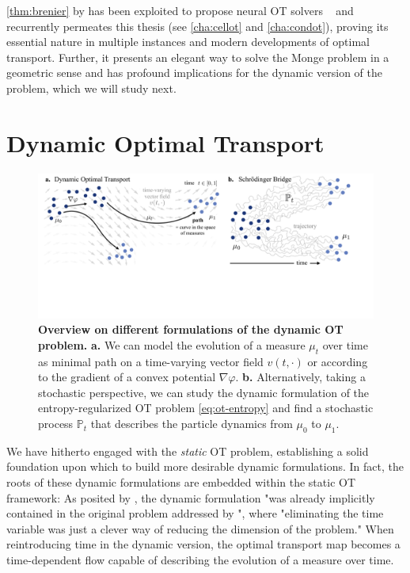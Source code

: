 \cref{thm:brenier} by \citet{brenier1987decomposition, brenier1991polar} has been exploited to propose neural OT solvers ~\citep{taghvaei20192, makkuva2020optimal, korotin2021wasserstein, bunne2022proximal, alvarez2021optimizing, mokrov2021large, amos2023amortizing} and recurrently permeates this thesis (see  \cref{cha:cellot} and \ref{cha:condot}), proving its essential nature in multiple instances and modern developments of optimal transport.
Further, it presents an elegant way to solve the Monge problem in a geometric sense and has profound implications for the dynamic version of the problem, which we will study next.


\section{Dynamic Optimal Transport} \label{sec:background_ot_dynamic}

\begin{figure}[t]
  \includegraphics[width=\textwidth]{figures/fig_dynamic_ot_background.pdf}
  \caption{ \textbf{Overview on different formulations of the dynamic OT problem.} \textbf{a.} We can model the evolution of a measure $\mu_t$ over time as minimal path on a time-varying vector field $v(t, \cdot)$ or according to the gradient of a convex potential $\nabla \varphi$. \textbf{b.} Alternatively, taking a stochastic perspective, we can study the dynamic formulation of the entropy-regularized \acrshort{OT} problem \eqref{eq:ot-entropy} and find a stochastic process $\mathbb{P}_t$ that describes the particle dynamics from $\mu_0$ to $\mu_1$.}	
  \label{fig:dynamic_ot_background}
\end{figure}

We have hitherto engaged with the \emph{static} \acrlong{OT} problem, establishing a solid foundation upon which to build more desirable dynamic formulations. In fact, the roots of these dynamic formulations are embedded within the static \acrshort{OT} framework: As posited by \citet{benamou2000computational}, the dynamic formulation "was already implicitly contained in the original problem addressed by \citeauthor{monge1781histoire}", where "eliminating the time variable was just a clever way of reducing the dimension of the problem." When reintroducing time in the dynamic version, the optimal transport map becomes a time-dependent flow capable of describing the evolution of a measure over time.

